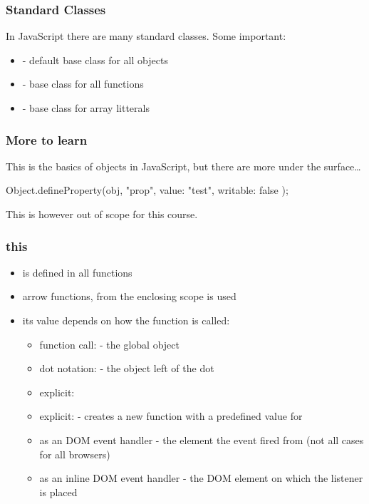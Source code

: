 \begin{frame}[fragile] \frametitle{Standard Classes}
In JavaScript there are many standard classes. Some important: 
\begin{itemize}
  \item {} - default base class for all objects
  \item {} - base class for all functions
  \item {} - base class for array litterals
\end{itemize}
\end{frame}

\begin{frame}[fragile] \frametitle{More to learn}

This is the basics of objects in JavaScript, but there are more under the surface\ldots
\vspace{8mm}
\begin{CodeBox}{}
Object.defineProperty(obj, "prop", {
    value: "test",
    writable: false
});
\end{CodeBox}
\vspace{8mm}
This is however out of scope for this course.
\end{frame}

\begin{frame}[fragile] \frametitle{this}
\begin{itemize}
  \item {} is defined in all functions
  \item arrow functions,  from the enclosing scope is used
  \item its value depends on how the function is called:
  \begin{itemize}
    \item function call:  - the global object
    \item dot notation:  - the object left of the dot
    \item explicit: 
    \item explicit:  - creates a new function with a predefined value for 
    \item as an DOM event handler - the element the event fired from (not all cases for all browsers)
    \item as an inline DOM event handler - the DOM element on which the listener is placed
  \end{itemize}
\end{itemize}
\end{frame}

